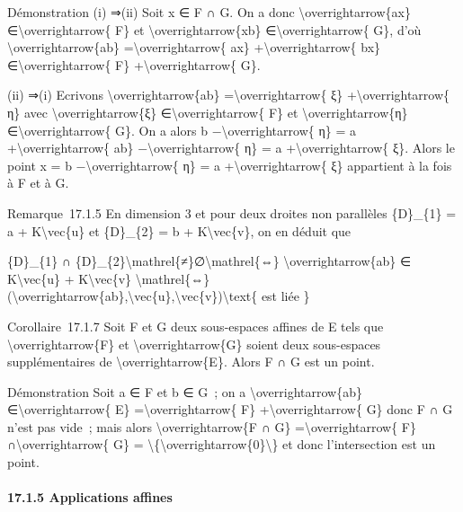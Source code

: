 \documentclass[]{article}
\begin{document}
Démonstration (i) ⇒(ii) Soit x ∈ F ∩ G. On a donc
\textbackslash{}overrightarrow\{ax\} ∈\textbackslash{}overrightarrow\{
F\} et \textbackslash{}overrightarrow\{xb\}
∈\textbackslash{}overrightarrow\{ G\}, d'où
\textbackslash{}overrightarrow\{ab\} =\textbackslash{}overrightarrow\{
ax\} +\textbackslash{}overrightarrow\{ bx\}
∈\textbackslash{}overrightarrow\{ F\} +\textbackslash{}overrightarrow\{
G\}.

(ii) ⇒(i) Ecrivons \textbackslash{}overrightarrow\{ab\}
=\textbackslash{}overrightarrow\{ ξ\} +\textbackslash{}overrightarrow\{
η\} avec \textbackslash{}overrightarrow\{ξ\}
∈\textbackslash{}overrightarrow\{ F\} et
\textbackslash{}overrightarrow\{η\} ∈\textbackslash{}overrightarrow\{
G\}. On a alors b −\textbackslash{}overrightarrow\{ η\} = a
+\textbackslash{}overrightarrow\{ ab\} −\textbackslash{}overrightarrow\{
η\} = a +\textbackslash{}overrightarrow\{ ξ\}. Alors le point x = b
−\textbackslash{}overrightarrow\{ η\} = a
+\textbackslash{}overrightarrow\{ ξ\} appartient à la fois à F et à G.

Remarque~17.1.5 En dimension 3 et pour deux droites non parallèles
\{D\}\_\{1\} = a + K\textbackslash{}vec\{u\} et \{D\}\_\{2\} = b +
K\textbackslash{}vec\{v\}, on en déduit que

\{D\}\_\{1\} ∩
\{D\}\_\{2\}\textbackslash{}mathrel\{≠\}∅\textbackslash{}mathrel\{⇔\}
\textbackslash{}overrightarrow\{ab\} ∈ K\textbackslash{}vec\{u\} +
K\textbackslash{}vec\{v\} \textbackslash{}mathrel\{⇔\}
(\textbackslash{}overrightarrow\{ab\},\textbackslash{}vec\{u\},\textbackslash{}vec\{v\})\textbackslash{}text\{
est liée \}

Corollaire~17.1.7 Soit F et G deux sous-espaces affines de E tels que
\textbackslash{}overrightarrow\{F\} et
\textbackslash{}overrightarrow\{G\} soient deux sous-espaces
supplémentaires de \textbackslash{}overrightarrow\{E\}. Alors F ∩ G est
un point.

Démonstration Soit a ∈ F et b ∈ G~; on a
\textbackslash{}overrightarrow\{ab\} ∈\textbackslash{}overrightarrow\{
E\} =\textbackslash{}overrightarrow\{ F\}
+\textbackslash{}overrightarrow\{ G\} donc F ∩ G n'est pas vide~; mais
alors \textbackslash{}overrightarrow\{F ∩ G\}
=\textbackslash{}overrightarrow\{ F\} ∩\textbackslash{}overrightarrow\{
G\} =
\textbackslash{}\{\textbackslash{}overrightarrow\{0\}\textbackslash{}\}
et donc l'intersection est un point.

\paragraph{17.1.5 Applications affines}
\end{document}
